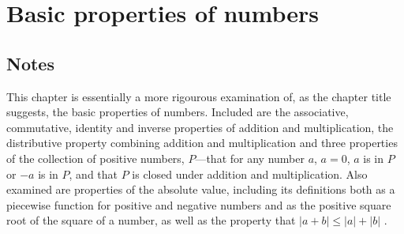 \section{Basic properties of numbers}

\subsection{Notes}
This chapter is essentially a more rigourous examination of, as the chapter title suggests, the basic properties of numbers. Included are the associative, commutative, identity and inverse properties of addition and multiplication, the distributive property combining addition and multiplication and three properties of the collection of positive numbers, $P$---that for any number $a$, $a = 0$, $a$ is in $P$ or $-a$ is in $P$, and that $P$ is closed under addition and multiplication. Also examined are properties of the absolute value, including its definitions both as a piecewise function for positive and negative numbers and as the positive square root of the square of a number, as well as the property that $|a + b| \le |a| + |b|$ .

